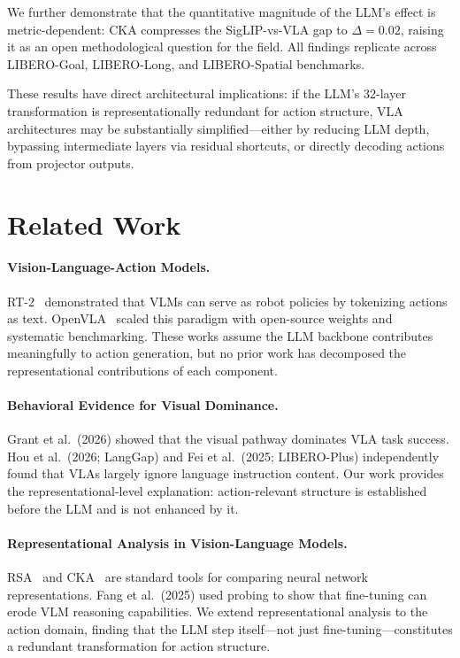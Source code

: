 \documentclass[letterpaper]{article}
\begin{document}
We further demonstrate that the quantitative magnitude of the LLM's effect is metric-dependent: CKA compresses the SigLIP-vs-VLA gap to $\Delta=0.02$, raising it as an open methodological question for the field.
All findings replicate across LIBERO-Goal, LIBERO-Long, and LIBERO-Spatial benchmarks.

These results have direct architectural implications: if the LLM's 32-layer transformation is representationally redundant for action structure, VLA architectures may be substantially simplified---either by reducing LLM depth, bypassing intermediate layers via residual shortcuts, or directly decoding actions from projector outputs.


\section{Related Work}
\label{sec:related}

\paragraph{Vision-Language-Action Models.}
RT-2~\citep{brohan2023rt2} demonstrated that VLMs can serve as robot policies by tokenizing actions as text.
OpenVLA~\citep{kim2024openvla} scaled this paradigm with open-source weights and systematic benchmarking.
These works assume the LLM backbone contributes meaningfully to action generation, but no prior work has decomposed the representational contributions of each component.

\paragraph{Behavioral Evidence for Visual Dominance.}
Grant et al.~(2026) showed that the visual pathway dominates VLA task success.
Hou et al.~(2026; LangGap) and Fei et al.~(2025; LIBERO-Plus) independently found that VLAs largely ignore language instruction content.
Our work provides the representational-level explanation: action-relevant structure is established before the LLM and is not enhanced by it.

\paragraph{Representational Analysis in Vision-Language Models.}
RSA~\citep{kriegeskorte2008rsa} and CKA~\citep{kornblith2019cka} are standard tools for comparing neural network representations.
Fang et al.~(2025) used probing to show that fine-tuning can erode VLM reasoning capabilities.
We extend representational analysis to the action domain, finding that the LLM step itself---not just fine-tuning---constitutes a redundant transformation for action structure.
\end{document}
